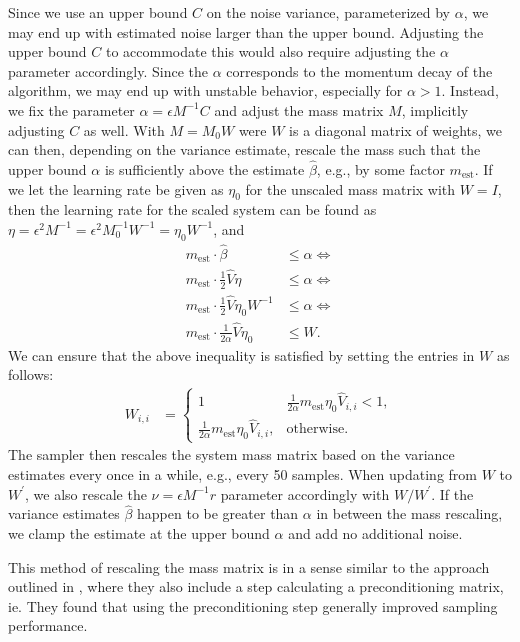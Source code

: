 Since we use an upper bound $C$ on the noise variance, parameterized by $\alpha$, we may end up with estimated noise larger than the upper bound.
Adjusting the upper bound $C$ to accommodate this would also require adjusting the $\alpha$ parameter accordingly.
Since the $\alpha$ corresponds to the momentum decay of the algorithm, we may end up with unstable behavior, especially for $\alpha > 1$. 
Instead, we fix the parameter $\alpha=\epsilon M^{-1}C$ and adjust the mass matrix $M$, implicitly adjusting $C$ as well.
With $M = M_0 W$ were $W$ is a diagonal matrix of weights, we can then, depending on the variance estimate, rescale the mass such that the upper bound $\alpha$ is sufficiently above the estimate $\hat\beta$, e.g., by some factor $m_{\text{est}}$.
If we let the learning rate be given as $\eta_0$  for the unscaled mass matrix with $W = I$, then the learning rate for the scaled system can be found as $\eta = \epsilon^2 M^{-1} = \epsilon^2 M_0^{-1}W^{-1} = \eta_0 W^{-1}$, and
\begin{align}
    m_{\text{est}} \cdot \hat{\beta}  &\leq \alpha \Leftrightarrow\\ 
    m_{\text{est}} \cdot \frac{1}{2} \hat V \eta   &\leq \alpha \Leftrightarrow\\ 
    m_{\text{est}} \cdot \frac{1}{2} \hat V \eta_0 W^{-1}  &\leq \alpha \Leftrightarrow\\ 
    m_{\text{est}} \cdot \frac{1}{2\alpha} \hat V \eta_0   &\leq W.
\end{align}
We can ensure that the above inequality is satisfied by setting the entries in $W$ as follows:  
    \begin{align}
    W_{i,i} &= \begin{cases}
        1 & \frac{1}{2\alpha}m_{\text{est}} \eta_0 \hat{V}_{i,i} < 1, \\
        \frac{1}{2\alpha}m_{\text{est}} \eta_0 \hat{V}_{i,i}, & \text{otherwise}.
    \end{cases}
\end{align}
The sampler then rescales the system mass matrix based on the variance estimates every once in a while, e.g., every 50 samples.
When updating from $W$ to $W^\prime$, we also rescale the $\nu=\epsilon M^{-1}r$ parameter accordingly with $W/W^\prime$.
If the variance estimates $\hat \beta$ happen to be greater than $\alpha$ in between the mass rescaling, we clamp the estimate at the upper bound $\alpha$ and add no additional noise. 

This method of rescaling the mass matrix is in a sense similar to the approach outlined in \cite{wenzel_how_2020}, where they also include a step calculating a preconditioning matrix, ie.
They found that using the preconditioning step generally improved sampling performance.


